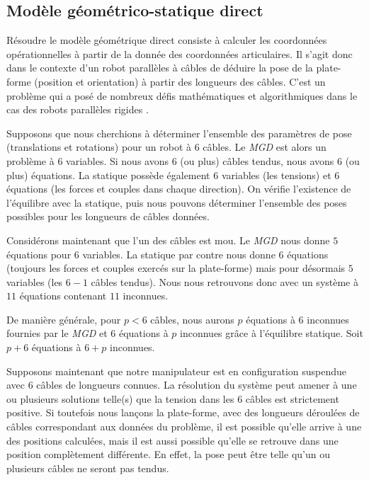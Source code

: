 \subsection{Modèle géométrico-statique direct}\label{chap0-1-4}

Résoudre le modèle géométrique direct consiste à calculer les coordonnées 
opéra\-tionnelles à partir de la donnée des coordonnées articulaires. Il s'agit 
donc dans le contexte d'un robot parallèles à câbles de déduire la pose de la 
plate-forme (position et orientation) à partir des longueurs des câbles. C'est 
un problème qui a posé de nombreux défis mathématiques et algorithmiques dans le 
cas des robots parallèles rigides \cite{merlet1997robots}.

Supposons que nous cherchions à déterminer l'ensemble des paramètres de pose 
(translations et rotations) pour un robot à $6$ câbles. Le {\it MGD} est alors 
un problème à $6$ variables. Si nous avons 6 (ou plus) câbles tendus, nous avons 
$6$ (ou plus) équations. La statique possède également $6$ variables (les 
tensions) et $6$ équations (les forces et couples dans chaque direction). On 
vérifie l'existence de l'équilibre avec la statique, puis nous pouvons 
déterminer l'ensemble des poses possibles pour les longueurs de câbles données.

Considérons maintenant que l'un des câbles est mou. Le {\it MGD} nous donne $5$ 
équations pour $6$ variables. La statique par contre nous donne $6$ équations 
(toujours les forces et couples exercés sur la plate-forme) mais pour désormais 
$5$ variables (les $6-1$ câbles tendus). Nous nous retrouvons donc avec un 
système à $11$ équations contenant $11$ inconnues.

De manière générale, pour $p < 6$ câbles, nous aurons $p$ équations à $6$ 
inconnues fournies par le {\it MGD} et $6$ équations à $p$ inconnues grâce à 
l'équilibre statique. Soit $p+6$ équations à $6+p$ inconnues.

Supposons maintenant que notre manipulateur est en configuration suspendue avec 
$6$ câbles de longueurs connues. La résolution du système peut amener à une ou 
plusieurs solutions telle(s) que la tension dans les $6$ câbles est strictement 
positive. Si toutefois nous lançons la plate-forme, avec des longueurs déroulées 
de câbles correspondant aux données du problème, il est possible qu'elle arrive 
à une des positions calculées, mais il est aussi possible qu'elle se retrouve 
dans une position complètement différente. En effet, la pose peut être telle 
qu'un ou plusieurs câbles ne seront pas tendus.


